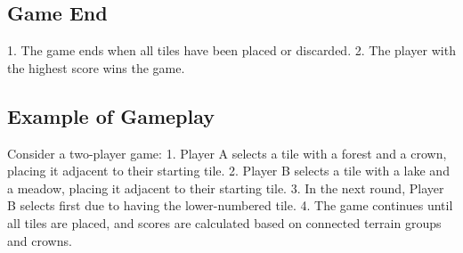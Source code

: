 \documentclass[conference]{IEEEtran}
\begin{document}
\subsection{Game End}
1. The game ends when all tiles have been placed or discarded.
2. The player with the highest score wins the game.

\subsection{Example of Gameplay}
Consider a two-player game:
1. Player A selects a tile with a forest and a crown, placing it adjacent to their starting tile.
2. Player B selects a tile with a lake and a meadow, placing it adjacent to their starting tile.
3. In the next round, Player B selects first due to having the lower-numbered tile.
4. The game continues until all tiles are placed, and scores are calculated based on connected terrain groups and crowns.



\end{document}
